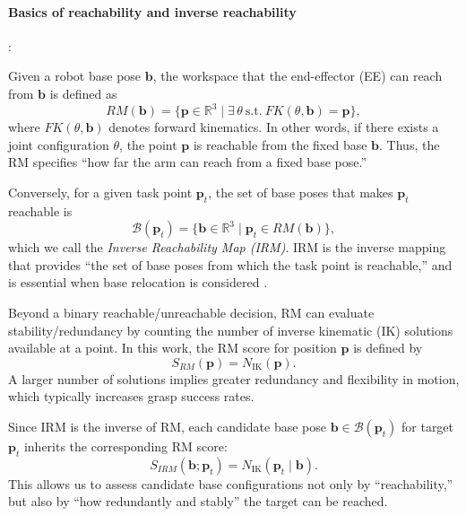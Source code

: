 \documentclass[../../main.tex]{subfiles} %
\begin{document}
\paragraph{Basics of reachability and inverse reachability}:

Given a robot base pose $\mathbf{b}$, the workspace that the end-effector (EE) can reach from $\mathbf{b}$ is defined as
\begin{equation}
RM(\mathbf{b}) = \{ \mathbf{p} \in \mathbb{R}^3 \mid \exists\, \theta \ \text{s.t.} \ FK(\theta, \mathbf{b}) = \mathbf{p} \},
\end{equation}
where $FK(\theta,\mathbf{b})$ denotes forward kinematics.  
In other words, if there exists a joint configuration $\theta$, the point $\mathbf{p}$ is reachable from the fixed base $\mathbf{b}$.  
Thus, the RM specifies “how far the arm can reach from a fixed base pose.”

Conversely, for a given task point $\mathbf{p}_t$, the set of base poses that makes $\mathbf{p}_t$ reachable is
\begin{equation}
\mathcal{B}(\mathbf{p}_t) = \{ \mathbf{b} \in \mathbb{R}^3 \mid \mathbf{p}_t \in RM(\mathbf{b}) \},
\end{equation}
which we call the \textit{Inverse Reachability Map (IRM)}.  
IRM is the inverse mapping that provides “the set of base poses from which the task point is reachable,” 
and is essential when base relocation is considered \cite{RM}.

Beyond a binary reachable/unreachable decision, RM can evaluate stability/redundancy 
by counting the number 
of inverse kinematic (IK) solutions available at a point.  
In this work, the RM score for position $\mathbf{p}$ is defined by
\begin{equation}
S_{RM}(\mathbf{p}) = N_{\text{IK}}(\mathbf{p}).
\end{equation}
A larger number of solutions implies greater redundancy and flexibility in motion, 
which typically increases grasp success rates.

Since IRM is the inverse of RM, each candidate base pose $\mathbf{b}\in\mathcal{B}(\mathbf{p}_t)$ 
for target $\mathbf{p}_t$ inherits the corresponding RM score:
\begin{equation}
S_{IRM}(\mathbf{b}; \mathbf{p}_t) = N_{\text{IK}}(\mathbf{p}_t \mid \mathbf{b}).
\end{equation}
This allows us to assess candidate base configurations not only by “reachability,” 
but also by “how redundantly and stably” the target can be reached.
\end{document}
